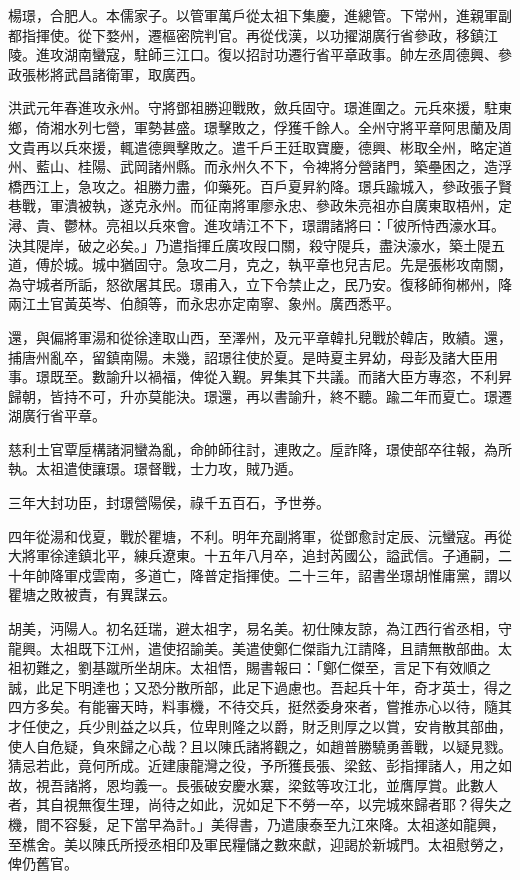 \begin{pinyinscope}
楊璟，合肥人。本儒家子。以管軍萬戶從太祖下集慶，進總管。下常州，進親軍副都指揮使。從下婺州，遷樞密院判官。再從伐漢，以功擢湖廣行省參政，移鎮江陵。進攻湖南蠻寇，駐師三江口。復以招討功遷行省平章政事。帥左丞周德興、參政張彬將武昌諸衛軍，取廣西。

洪武元年春進攻永州。守將鄧祖勝迎戰敗，斂兵固守。璟進圍之。元兵來援，駐東鄉，倚湘水列七營，軍勢甚盛。璟擊敗之，俘獲千餘人。全州守將平章阿思蘭及周文貴再以兵來援，輒遣德興擊敗之。遣千戶王廷取寶慶，德興、彬取全州，略定道州、藍山、桂陽、武岡諸州縣。而永州久不下，令裨將分營諸門，築壘困之，造浮橋西江上，急攻之。祖勝力盡，仰藥死。百戶夏昇約降。璟兵踰城入，參政張子賢巷戰，軍潰被執，遂克永州。而征南將軍廖永忠、參政朱亮祖亦自廣東取梧州，定潯、貴、鬱林。亮祖以兵來會。進攻靖江不下，璟謂諸將曰：「彼所恃西濠水耳。決其隄岸，破之必矣。」乃遣指揮丘廣攻叚口關，殺守隄兵，盡決濠水，築土隄五道，傅於城。城中猶固守。急攻二月，克之，執平章也兒吉尼。先是張彬攻南關，為守城者所詬，怒欲屠其民。璟甫入，立下令禁止之，民乃安。復移師徇郴州，降兩江土官黃英岑、伯顏等，而永忠亦定南寧、象州。廣西悉平。

還，與偏將軍湯和從徐達取山西，至澤州，及元平章韓扎兒戰於韓店，敗績。還，捕唐州亂卒，留鎮南陽。未幾，詔璟往使於夏。是時夏主昇幼，母彭及諸大臣用事。璟既至。數諭升以禍福，俾從入覲。昇集其下共議。而諸大臣方專恣，不利昇歸朝，皆持不可，升亦莫能決。璟還，再以書諭升，終不聽。踰二年而夏亡。璟遷湖廣行省平章。

慈利土官覃垕構諸洞蠻為亂，命帥師往討，連敗之。垕詐降，璟使部卒往報，為所執。太祖遣使讓璟。璟督戰，士力攻，賊乃遁。

三年大封功臣，封璟營陽侯，祿千五百石，予世券。

四年從湯和伐夏，戰於瞿塘，不利。明年充副將軍，從鄧愈討定辰、沅蠻寇。再從大將軍徐達鎮北平，練兵遼東。十五年八月卒，追封芮國公，謚武信。子通嗣，二十年帥降軍戍雲南，多道亡，降普定指揮使。二十三年，詔書坐璟胡惟庸黨，謂以瞿塘之敗被責，有異謀云。

胡美，沔陽人。初名廷瑞，避太祖字，易名美。初仕陳友諒，為江西行省丞相，守龍興。太祖既下江州，遣使招諭美。美遣使鄭仁傑詣九江請降，且請無散部曲。太祖初難之，劉基蹴所坐胡床。太祖悟，賜書報曰：「鄭仁傑至，言足下有效順之誠，此足下明達也；又恐分散所部，此足下過慮也。吾起兵十年，奇才英士，得之四方多矣。有能審天時，料事機，不待交兵，挺然委身來者，嘗推赤心以待，隨其才任使之，兵少則益之以兵，位卑則隆之以爵，財乏則厚之以賞，安肯散其部曲，使人自危疑，負來歸之心哉？且以陳氏諸將觀之，如趙普勝驍勇善戰，以疑見戮。猜忌若此，竟何所成。近建康龍灣之役，予所獲長張、梁鉉、彭指揮諸人，用之如故，視吾諸將，恩均義一。長張破安慶水寨，梁鉉等攻江北，並膺厚賞。此數人者，其自視無復生理，尚待之如此，況如足下不勞一卒，以完城來歸者耶？得失之機，間不容髮，足下當早為計。」美得書，乃遣康泰至九江來降。太祖遂如龍興，至樵舍。美以陳氏所授丞相印及軍民糧儲之數來獻，迎謁於新城門。太祖慰勞之，俾仍舊官。


\end{pinyinscope}
